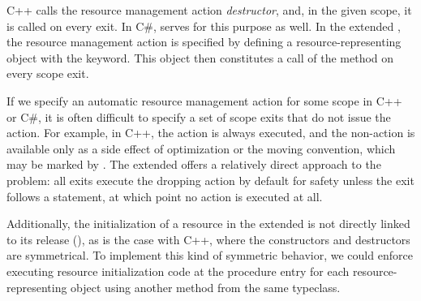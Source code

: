 C++ calls the resource management action \emph{destructor}, and, in the given scope, it is called on every exit. In C\#,  serves for this purpose as well. In the extended \cmm, the resource management action is specified by defining a resource-representing object with the  keyword. This object then constitutes a call of the  method on every scope exit.

If we specify an automatic resource management action for some scope in C++ or C\#, it is often difficult to specify a set of scope exits that do not issue the action. For example, in C++, the action is always executed, and the non-action is available only as a side effect of optimization or the moving convention, which may be marked by . The extended \cmm offers a relatively direct approach to the problem: all exits execute the dropping action by default for safety unless the exit follows a  statement, at which point no action is executed at all.

Additionally, the initialization of a resource in the extended \cmm is not directly linked to its release (), as is the case with C++, where the constructors and destructors are symmetrical. To implement this kind of symmetric behavior, we could enforce executing resource initialization code at the procedure entry for each resource-representing object using another method from the same typeclass.
